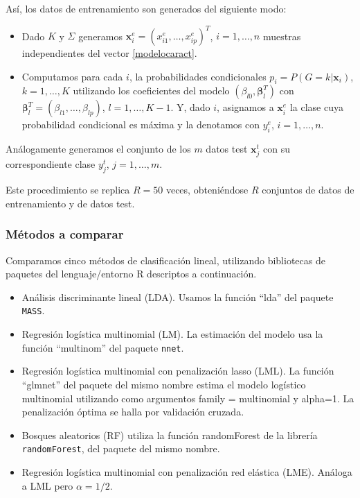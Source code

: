\documentclass{report}
\begin{document}
Así, los datos de entrenamiento son generados del siguiente modo: 

\begin{itemize}
	\item Dado $K$ y $\Sigma$ generamos $\mathbf{x}_{i}^ {e}=(x_{i1}^{e},\ldots, x_{ip}^{e})^T$, $i=1,\ldots, n$ muestras independientes del vector \eqref{modelocaract}. 
	\item Computamos para cada $i$, la probabilidades condicionales $p_i=P(G=k|\mathbf{x}_i)$, $k=1,\ldots,  K$ utilizando  los coeficientes del modelo   $(\beta_{l0}, \boldsymbol{\beta}_{l}^T)$ con $\boldsymbol{\beta}_l^T = (\beta_{l1}, \ldots, \beta_{lp})$, $l = 1, \ldots, K-1$.
	Y, dado $i$, asignamos a $\mathbf{x}_i^{e}$ la clase cuya probabilidad condicional es máxima y la denotamos con $y_i^{e}$, $i=1,\ldots,n$. 
\end{itemize}

Análogamente generamos el conjunto de los $m$ datos test   $\mathbf{x}_j^{t}$ con su correspondiente clase  $y_j^{t}$, $j=1,\ldots,m$.

Este procedimiento se replica $R=50$ veces, obteniéndose $R$ conjuntos de datos de entrenamiento y de datos test.   

\subsubsection*{Métodos a comparar  }
Comparamos cinco métodos de clasificación lineal, utilizando bibliotecas de paquetes del lenguaje/entorno R descriptos a continuación. 
\begin{itemize}
	\item Análisis discriminante lineal (LDA). Usamos la función ``lda'' del paquete \texttt{MASS}. 
	\item Regresión logística multinomial (LM). La estimación del modelo usa la función ``multinom'' del paquete \texttt{nnet}. 
	\item Regresión logística multinomial con penalización lasso (LML). La función ``glmnet'' del paquete del mismo nombre estima el modelo logístico multinomial utilizando como argumentos family = multinomial y alpha=1. La penalización óptima se halla por validación cruzada. 
	\item Bosques aleatorios (RF) utiliza la función randomForest de la librería \texttt{randomForest}, del paquete del mismo nombre. 
	\item Regresión logística multinomial con penalización red elástica (LME). Análoga a LML  pero $\alpha=1/2$. 
\end{itemize}
\end{document}
